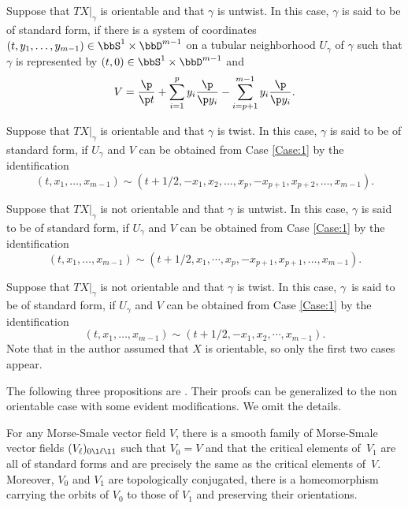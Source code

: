 \Case\label{Case:1}
Suppose that $TX|_{\gamma}$ is orientable and that $\gamma$ is
untwist. In this case, $\gamma$ is said to be of standard form, if there
is a system of coordinates $(t,y_{1},\ldots,
y_{m-1})\in \bbS^{1}\times \bbD^{m-1}$
on a tubular neighborhood
$U_{\gamma}$ of $\gamma$ such that $\gamma$ is represented by
$(t,0)\in \bbS^{1}\times \bbD^{m-1}$ and
\begin{equation*}\label{eqV}
V=\frac{\p}{\p t}+\sum_{i=1}^{p}y_{i}\frac{\p}{\p
y_{i}}-\sum_{i=p+1}^{m-1}y_{i}\frac{\p}{\p y_{i}}.
\end{equation*}

\Case\label{Case:2}
Suppose that $TX|_{{\gamma}}$ is orientable and
that $\gamma$ is
twist. In this case, $\gamma$ is said to be of standard form, if
$U_{\gamma}$ and $V$ can be obtained
from Case \ref{Case:1} by the identification
\begin{equation*}\label{enid}
(t,
x_{1},\ldots,x_{m-1})\sim (t+1/2,
-x_{1},x_{2},\ldots, x_{p}, -x_{p+1}, x_{p+2},\ldots,x_{m-1}).
\end{equation*}

\Case\label{Case:3}
Suppose that $TX|_{{\gamma}}$ is not orientable and
that $\gamma$ is
untwist. In this case, $\gamma$ is said to be of standard form, if
$U_{\gamma}$ and $V$ can be obtained
from Case \ref{Case:1} by the identification
\begin{equation*}
(t,
x_{1},\ldots,x_{m-1})\sim (t+1/2,
x_{1},\cdots,x_{p},-x_{p+1},x_{p+1},\ldots,x_{m-1}). \end{equation*}

\Case\label{Case:4}
Suppose that $TX|_{{\gamma}}$ is not orientable
and that $\gamma$ is
twist. In this case, $\gamma$~is said to be of standard form, if
$U_{\gamma}$ and $V$ can be obtained
from Case \ref{Case:1} by the identification
\begin{equation*}
(t,
x_{1},\ldots,x_{m-1})\sim (t+1/2,
-x_{1},x_{2},\cdots,x_{m-1}).
\end{equation*}
Note that in \cite[\S 1]{Franks1979} the author assumed that $X$ is orientable, so only the first two cases appear.

The following three propositions are \cite[Prop.\,1.6,
Th.\,2.2, Prop.\,5.1]{Franks1979}.
Their proofs can be generalized to the non orientable case
with some evident modifications. We omit the details.

\begin{prop}\label{propV01}
For any Morse-Smale vector field $V$, there is a smooth family of Morse-Smale
vector fields $(V_{\ell})_{0\l \ell\l 1}$ such that $V_{0}=V$ and that the critical
elements of~$V_{1}$ are all of standard forms and are precisely the same as the critical
elements of~$V$. Moreover, $V_0$ and $V_1$ are topologically
conjugated, \ie there is a homeomorphism carrying the orbits
of $V_0$ to those of $V_{1}$ and preserving their orientations.
\end{prop}

